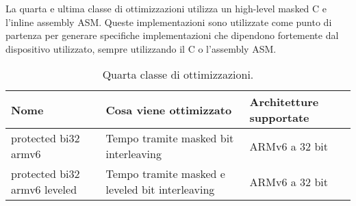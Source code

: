 \noindent La quarta e ultima classe di ottimizzazioni utilizza un high-level masked C e l'inline assembly ASM\cite{github}. Queste implementazioni sono utilizzate come punto di partenza per generare specifiche implementazioni che dipendono fortemente dal dispositivo utilizzato, sempre utilizzando il C o l'assembly ASM.

\begin{table}[H]
    \centering
	\begin{tabular}{|m{}<{\centering}||m{}<{\centering}|m{}<{\centering}|}
		\hline
		\textbf{Nome} & \textbf{Cosa viene ottimizzato} & \textbf{Architetture supportate} \\
        \hline \hline
        protected bi32 armv6 & Tempo tramite masked bit interleaving & ARMv6 a 32 bit \\
        \hline
        protected bi32 armv6 leveled & Tempo tramite masked e leveled bit interleaving & ARMv6 a 32 bit \\
        \hline
    \end{tabular}
    \caption{Quarta classe di ottimizzazioni.}
\end{table}
